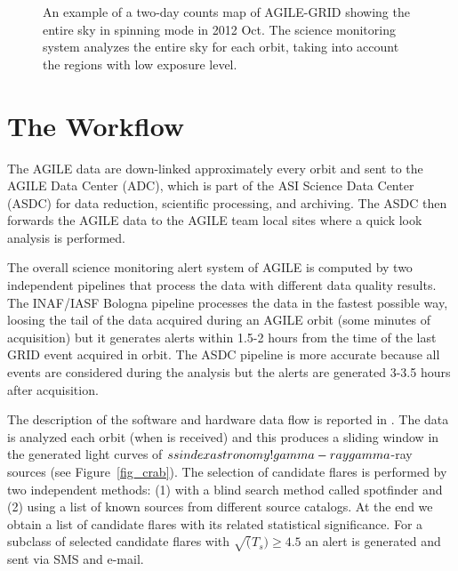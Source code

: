\begin{figure}[t]
\caption{An example of a two-day counts map of AGILE-GRID showing the entire sky in spinning mode in 2012 Oct. The science monitoring system analyzes the entire sky for each orbit, taking into account the regions with low exposure level.} \label{fig_fov}
\end{figure}

\section{The Workflow}

The AGILE data are down-linked approximately every orbit and sent to the AGILE Data Center (ADC), which is part of the ASI Science Data Center (ASDC) for data reduction, scientific processing, and archiving. The ASDC then forwards the AGILE data to the AGILE team local sites where a quick look analysis is performed.

The overall science monitoring alert system of AGILE is computed by two independent pipelines that process the data with different data quality results. The INAF/IASF Bologna pipeline processes the data in the fastest possible way, loosing the tail of the data acquired during an AGILE orbit (some minutes of acquisition) but it generates alerts within 1.5-2 hours from the time of the last GRID event acquired in orbit. The ASDC pipeline is more accurate because all events are considered during the analysis but the alerts are generated 3-3.5 hours after acquisition.

The description of the software and hardware data flow is reported in \citep{2009ASPC..411..362B}. The data is analyzed each orbit (when is received) and this produces a sliding window in the generated light curves of $\\ssindex{astronomy!gamma-ray}gamma$-ray sources (see Figure~\ref{fig_crab}). The selection of candidate flares is performed by two independent methods: (1) with a blind search method called spotfinder and (2) using a list of known sources from different source catalogs. At the end we obtain a list of candidate flares with its related statistical significance. For a subclass of selected candidate flares with $\sqrt(T_s) \ge 4.5$ an alert is generated and sent via SMS and e-mail.

